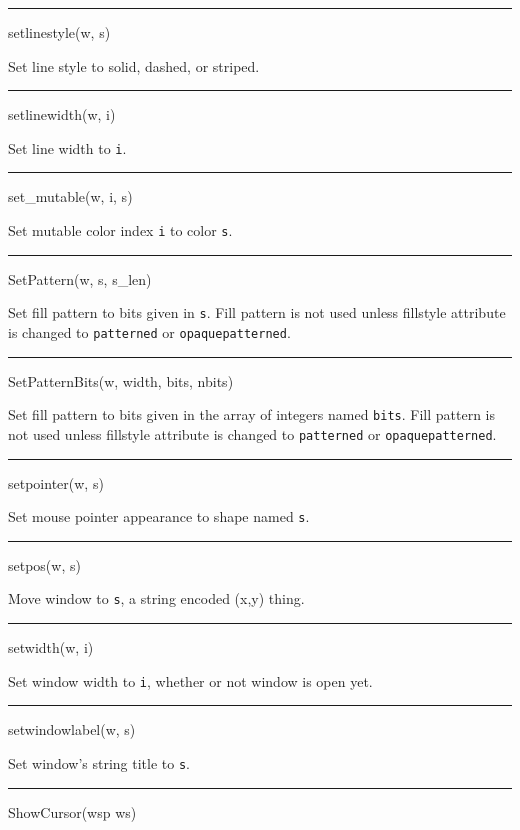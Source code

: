 \bigskip\hrule\vspace{0.1cm}
\noindent
setlinestyle(w, s)


Set line style to solid, dashed, or striped.


\bigskip\hrule\vspace{0.1cm}
\noindent
setlinewidth(w, i)


Set line width to \texttt{i}.


\bigskip\hrule\vspace{0.1cm}
\noindent
set\_mutable(w, i, s)


Set mutable color index \texttt{i} to color \texttt{s}.


\bigskip\hrule\vspace{0.1cm}
\noindent
SetPattern(w, s, s\_len)


Set fill pattern to bits given in \texttt{s}. Fill pattern is not used
unless fillstyle attribute is changed to
\texttt{{\textquotedbl}patterned{\textquotedbl}} or
\texttt{{\textquotedbl}opaquepatterned{\textquotedbl}}.


\bigskip\hrule\vspace{0.1cm}
\noindent
SetPatternBits(w, width, bits, nbits)


Set fill pattern to bits given in the array of integers named
\texttt{bits}. Fill pattern is not used unless fillstyle attribute is
changed to \texttt{{\textquotedbl}patterned{\textquotedbl}} or
\texttt{{\textquotedbl}opaquepatterned{\textquotedbl}}.


\bigskip\hrule\vspace{0.1cm}
\noindent
setpointer(w, s)


Set mouse pointer appearance to shape named \texttt{s}.


\bigskip\hrule\vspace{0.1cm}
\noindent
setpos(w, s)


Move window to \texttt{s}, a string encoded
{\textquotedbl}(x,y){\textquotedbl} thing.


\bigskip\hrule\vspace{0.1cm}
\noindent
setwidth(w, i)


Set window width to \texttt{i}, whether or not window is open yet.


\bigskip\hrule\vspace{0.1cm}
\noindent
setwindowlabel(w, s)


Set window's string title to \texttt{s}.


\bigskip\hrule\vspace{0.1cm}
\noindent
ShowCursor(wsp ws)


